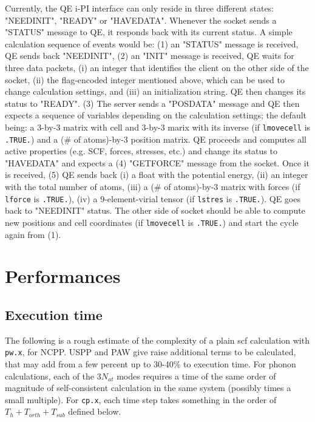 \documentclass[12pt,a4paper]{article}
\def\pwx{\texttt{pw.x}}
\def\cpx{\texttt{cp.x}}
\begin{document}
Currently, the QE i-PI interface can only reside in
three different states: "NEEDINIT", "READY" or "HAVEDATA". Whenever 
the socket sends a "STATUS" message to QE, it responds back with its 
current status. A simple calculation sequence of events would be: (1) an
"STATUS" message is received, QE sends back "NEEDINIT", (2) an "INIT"
message is received, QE waits for three data packets, (i) an integer
that identifies the client on the other side of the socket, (ii) the flag-encoded integer
mentioned above, which can be used to change calculation 
settings, and (iii) an initialization string. QE then changes its status
to "READY". (3) The server sends a "POSDATA" message and QE then expects 
a sequence of variables depending on the calculation settings; the default 
being: a 3-by-3 matrix with cell and 3-by-3 marix with its inverse (if 
\verb#lmovecell# is \verb#.TRUE.#) and a (\# of atoms)-by-3 position matrix. QE 
proceeds and computes all active properties (e.g. SCF, forces, stresses, 
etc.) and change its status to "HAVEDATA" and expects a (4) "GETFORCE"
message from the socket. Once it is received, (5) QE sends back (i) a
float with the potential energy, (ii) an integer with the total number of
atoms, (iii) a (\# of atoms)-by-3 matrix with forces (if \verb#lforce# is
\verb#.TRUE.#), (iv) a 9-element-virial tensor (if \verb#lstres# is
\verb#.TRUE.#). QE goes back to "NEEDINIT" status. The other side of socket
should be able to compute new positions and cell coordinates (if \verb#lmovecell#
is \verb#.TRUE.#) and start the cycle again from (1).

\section{Performances}

\subsection{Execution time}

The following is a rough estimate of the complexity of a plain
scf calculation with \pwx, for NCPP. USPP and PAW 
give raise additional terms to be calculated, that may add from a 
few percent 
up to 30-40\% to execution time. For phonon calculations, each of the
$3N_{at}$ modes requires a time of the same order of magnitude of
self-consistent calculation in the same system (possibly times a small multiple). 
For \cpx, each time step takes something in the order of
$T_h + T_{orth} + T_{sub}$ defined below.
\end{document}
